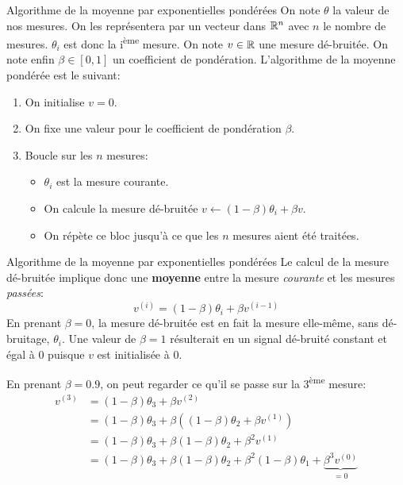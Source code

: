 \begin{frame}{Algorithme de la moyenne par exponentielles pondérées}
	On note $\theta$ la valeur de nos mesures. On les représentera par un vecteur dans $\mathbb{R}^n$ avec $n$ le nombre de mesures. $\theta_i$ est donc la i\textsuperscript{ème} mesure. On note $v \in \mathbb{R}$ une mesure dé-bruitée. On note enfin $\beta \in [0, 1]$ un coefficient de pondération. L'algorithme de la moyenne pondérée est le suivant:
	
	\begin{enumerate}
		\item On initialise $v = 0$.
		\item On fixe une valeur pour le coefficient de pondération $\beta$.
		\item Boucle sur les $n$ mesures:
		\begin{itemize}
			\item $\theta_i$ est la mesure courante.
			\item On calcule la mesure dé-bruitée $v \leftarrow (1 - \beta) \theta_i + \beta v$.
			\item On répète ce bloc jusqu'à ce que les $n$ mesures aient été traitées.
		\end{itemize}
	\end{enumerate}
\end{frame}

\begin{frame}{Algorithme de la moyenne par exponentielles pondérées}
	Le calcul de la mesure dé-bruitée implique donc une \textbf{moyenne} entre la mesure \textit{courante} et les mesures \textit{passées}:
	\begin{equation*}
		v^{(i)} = (1 - \beta) \theta_i + \beta v^{(i-1)}
	\end{equation*}
	En prenant $\beta = 0$, la mesure dé-bruitée est en fait la mesure elle-même, sans dé-bruitage, $\theta_i$. Une valeur de $\beta = 1$ résulterait en un signal dé-bruité constant et égal à 0 puisque $v$ est initialisée à 0.
	
	\pause
	\vspace{0.5cm}
	
	En prenant $\beta = 0.9$, on peut regarder ce qu'il se passe sur la 3\textsuperscript{ème} mesure:
	\begin{equation*}
		\begin{aligned}
			v^{(3)} 
			&= (1 - \beta) \theta_3 + \beta v^{(2)} \\
			&= (1 - \beta) \theta_3 + \beta \left((1 - \beta) \theta_{2} + \beta v^{(1)} \right) \\
			&= (1 - \beta) \theta_3 + \beta (1 - \beta) \theta_{2} + \beta^2 v^{(1)} \\
			&= (1 - \beta) \theta_3 + \beta (1 - \beta) \theta_{2} + \beta^2 (1 - \beta) \theta_{1} + \underbrace{\beta^3 v^{(0)}}_{= 0}
		\end{aligned}
	\end{equation*}
\end{frame}

